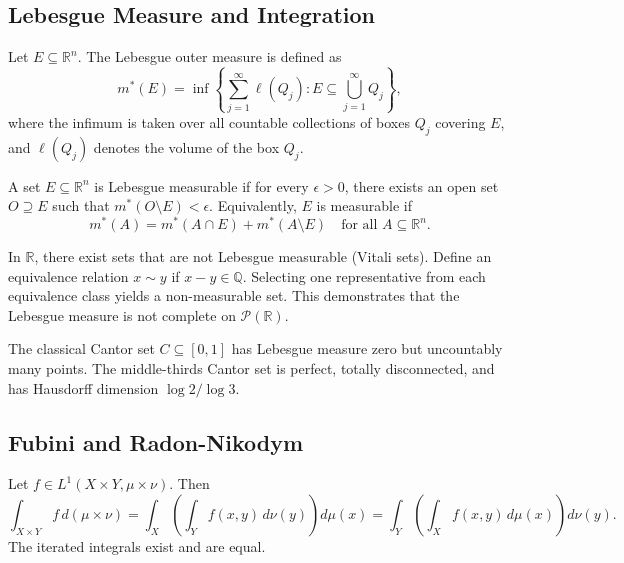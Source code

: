 \subsection{Lebesgue Measure and Integration}

\begin{definition}
Let $E \subseteq \mathbb{R}^n$. The Lebesgue outer measure is defined as
\[
m^*(E) = \inf\left\{ \sum_{j=1}^\infty \ell(Q_j) : E \subseteq \bigcup_{j=1}^\infty Q_j \right\},
\]
where the infimum is taken over all countable collections of boxes $Q_j$ covering $E$, and $\ell(Q_j)$ denotes the volume of the box $Q_j$.
\end{definition}

\begin{definition}
A set $E \subseteq \mathbb{R}^n$ is Lebesgue measurable if for every $\epsilon > 0$, there exists an open set $O \supseteq E$ such that $m^*(O \setminus E) < \epsilon$. Equivalently, $E$ is measurable if
\[
m^*(A) = m^*(A \cap E) + m^*(A \setminus E) \quad \text{for all } A \subseteq \mathbb{R}^n.
\]
\end{definition}

\begin{example}
In $\mathbb{R}$, there exist sets that are not Lebesgue measurable (Vitali sets). Define an equivalence relation $x \sim y$ if $x - y \in \mathbb{Q}$. Selecting one representative from each equivalence class yields a non-measurable set. This demonstrates that the Lebesgue measure is not complete on $\mathcal{P}(\mathbb{R})$.
\end{example}

\begin{example}
The classical Cantor set $C \subseteq [0,1]$ has Lebesgue measure zero but uncountably many points. The middle-thirds Cantor set is perfect, totally disconnected, and has Hausdorff dimension $\log 2 / \log 3$.
\end{example}

\subsection{Fubini and Radon-Nikodym}

\begin{theorem}
Let $f \in L^1(X \times Y, \mu \times \nu)$. Then
\[
\int_{X \times Y} f \, d(\mu \times \nu) = \int_X \left( \int_Y f(x,y) \, d\nu(y) \right) d\mu(x) = \int_Y \left( \int_X f(x,y) \, d\mu(x) \right) d\nu(y).
\]
The iterated integrals exist and are equal.
\end{theorem}

